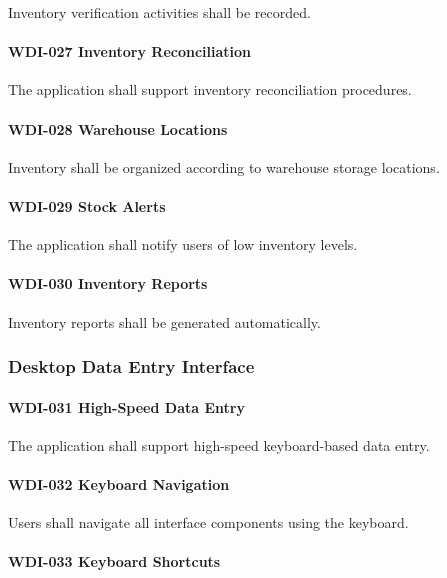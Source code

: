 Inventory verification activities shall be recorded.

\paragraph{WDI-027 Inventory Reconciliation}

The application shall support inventory reconciliation procedures.

\paragraph{WDI-028 Warehouse Locations}

Inventory shall be organized according to warehouse storage locations.

\paragraph{WDI-029 Stock Alerts}

The application shall notify users of low inventory levels.

\paragraph{WDI-030 Inventory Reports}

Inventory reports shall be generated automatically.


\subsubsection*{Desktop Data Entry Interface}

\paragraph{WDI-031 High-Speed Data Entry}

The application shall support high-speed keyboard-based data entry.

\paragraph{WDI-032 Keyboard Navigation}

Users shall navigate all interface components using the keyboard.

\paragraph{WDI-033 Keyboard Shortcuts}

